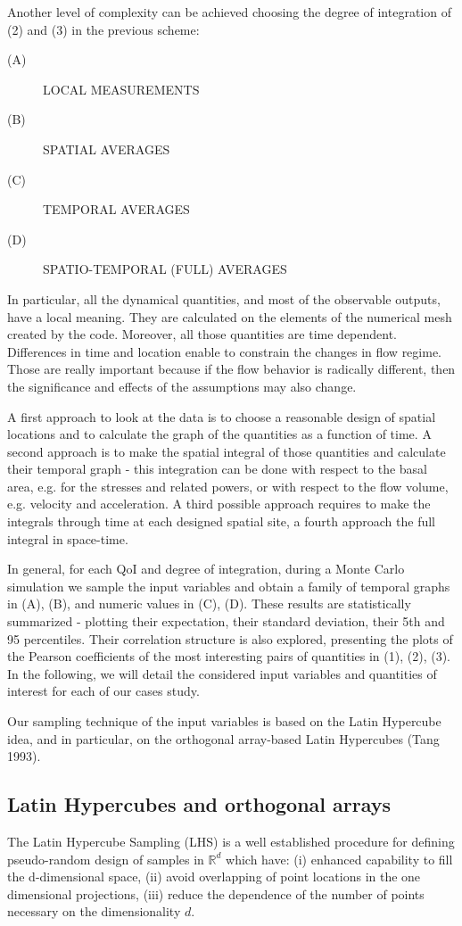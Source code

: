 \documentclass{article}
\begin{document}
Another level of complexity can be achieved choosing the degree of integration of (2) and (3) in the previous scheme:
\begin{description}
  \item[(A)] LOCAL MEASUREMENTS
  \item[(B)] SPATIAL AVERAGES
  \item[(C)] TEMPORAL AVERAGES
  \item[(D)] SPATIO-TEMPORAL (FULL) AVERAGES
\end{description}

In particular, all the dynamical quantities, and most of the observable outputs, have a local meaning. They are calculated on the elements of the numerical mesh created by the code. Moreover, all those quantities are time dependent. Differences in time and location enable to constrain the changes in flow regime. Those are really important because if the flow behavior is radically different, then the significance and effects of the assumptions may also change.

A first approach to look at the data is to choose a reasonable design of spatial locations and to calculate the graph of the quantities as a function of time. A second approach is to make the spatial integral of those quantities and calculate their temporal graph - this integration can be done with respect to the basal area, e.g. for the stresses and related powers, or with respect to the flow volume, e.g. velocity and acceleration. A third possible approach requires to make the integrals through time at each designed spatial site, a fourth approach the full integral in space-time.

In general, for each QoI and degree of integration, during a Monte Carlo simulation we sample the input variables and obtain a family of temporal graphs in (A), (B), and numeric values in (C), (D). These results are statistically summarized - plotting their expectation, their standard deviation, their 5th and 95 percentiles. Their correlation structure is also explored, presenting the plots of the Pearson coefficients of the most interesting pairs of quantities in (1), (2), (3). In the following, we will detail the considered input variables and quantities of interest for each of our cases study.

Our sampling technique of the input variables is based on the Latin Hypercube idea, and in particular, on the orthogonal array-based Latin Hypercubes (Tang 1993).

\subsection{Latin Hypercubes and orthogonal arrays}
The Latin Hypercube Sampling (LHS) is a well established procedure for defining pseudo-random design of samples in $\mathbb R^d$ which have: (i) enhanced capability to fill the d-dimensional space, (ii) avoid overlapping of point locations in the one dimensional projections, (iii) reduce the dependence of the number of points necessary on the dimensionality $d$.
\end{document}
